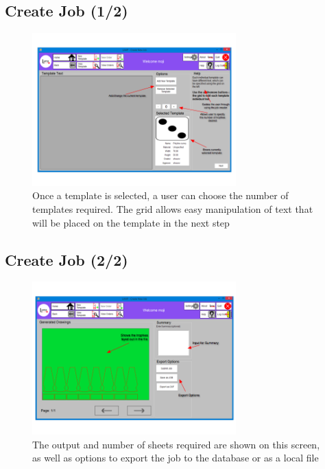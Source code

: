 \documentclass[oneside,openany,11pt,a4paper]{report}
\begin{document}
\subsection{Create Job (1/2)}
\begin{figure}[H]
	\centering
	\includegraphics[width=0.7\textwidth]{screen/createjob.png}
	\caption{Once a template is selected, a user can choose the number of templates required. The grid allows easy manipulation of text that will be placed on the template in the next step}
\end{figure}

\subsection{Create Job (2/2)}
\begin{figure}[H]
	\centering
	\includegraphics[width=0.7\textwidth]{screen/submitjob.png}
	\caption{The output and number of sheets required are shown on this screen, as well as options to export the job to the database or as a local file}
\end{figure}
\end{document}
